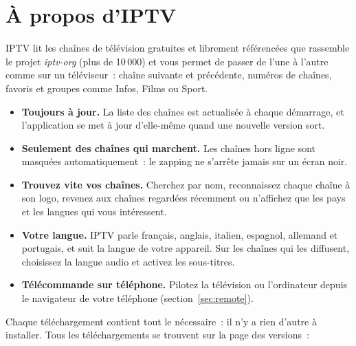 \newcommand{\GuideLang}{french}
\newcommand{\GuideTitle}{Guide de démarrage rapide}
\newcommand{\TipLabel}{Astuce.}




\section{À propos d'IPTV}

IPTV lit les chaînes de télévision gratuites et librement référencées que
rassemble le projet \emph{iptv-org} (plus de 10\,000) et vous permet de
passer de l'une à l'autre comme sur un téléviseur~: chaîne suivante et
précédente, numéros de chaînes, favoris et groupes comme Infos, Films ou
Sport.

\begin{itemize}
  \item \textbf{Toujours à jour.} La liste des chaînes est actualisée à
        chaque démarrage, et l'application se met à jour d'elle-même quand
        une nouvelle version sort.
  \item \textbf{Seulement des chaînes qui marchent.} Les chaînes hors ligne
        sont masquées automatiquement~: le zapping ne s'arrête jamais sur un
        écran noir.
  \item \textbf{Trouvez vite vos chaînes.} Cherchez par nom, reconnaissez
        chaque chaîne à son logo, revenez aux chaînes regardées récemment ou
        n'affichez que les pays et les langues qui vous intéressent.
  \item \textbf{Votre langue.} IPTV parle français, anglais, italien,
        espagnol, allemand et portugais, et suit la langue de votre appareil.
        Sur les chaînes qui les diffusent, choisissez la langue audio et
        activez les sous-titres.
  \item \textbf{Télécommande sur téléphone.} Pilotez la télévision ou
        l'ordinateur depuis le navigateur de votre téléphone
        (section~\ref{sec:remote}).
\end{itemize}

Chaque téléchargement contient tout le nécessaire~: il n'y a rien d'autre à
installer. Tous les téléchargements se trouvent sur la page des versions~:

